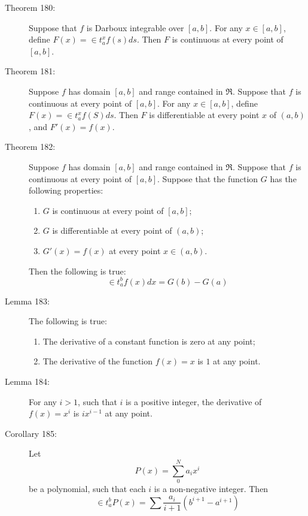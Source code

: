 \documentclass{article}
\begin{document}
\begin{description}
  \item[Theorem 180:] Suppose that $f$ is Darboux integrable over $[a,b]$. For any $x \in [a,b]$, define $F(x) = \in t_{a}^{x} f(s) ds$. Then $F$ is continuous at every point of $[a,b]$. 

  \item[Theorem 181:] Suppose $f$ has domain $[a,b]$ and range contained in $\Re$. Suppose that $f$ is continuous at every point of $[a,b]$. For any $x \in [a,b]$, define $F(x) = \in t_{a}^{x} f(S) ds$. Then $F$ is differentiable at every point $x$ of $(a,b)$, and $F' (x) = f(x)$. 

  \item[Theorem 182:] Suppose $f$ has domain $[a,b]$ and range contained in $\Re$. Suppose that $f$ is continuous at every point of $[a,b]$. Suppose that the function $G$ has the following properties:
    \begin{enumerate}[\hspace{1cm}1.]
      \item $G$ is continuous at every point of $[a,b]$;
      \item $G$ is differentiable at every point of $(a,b)$;
      \item $G' (x) = f(x)$ at every point $x \in (a,b)$.
    \end{enumerate}
    Then the following is true:
    \begin{equation*}
      \in t_{a}^{b} f(x) dx = G(b) -G(a)
    \end{equation*}

  \item[Lemma 183:] The following is true:
    \begin{enumerate}[\hspace{1cm}1.]
      \item The derivative of a constant function is zero at any point;
      \item The derivative of the function $f(x) = x$ is $1$ at any point.
    \end{enumerate}

  \item[Lemma 184:] For any $i > 1$, such that $i$ is a positive integer, the derivative of $f(x) = x^{i}$ is $ix^{i-1}$ at any point.

  \item[Corollary 185:] Let
    \begin{equation*}
      P(x) = \sum_{0}^{N} a_{i}x^{i}
    \end{equation*}
    be a polynomial, such that each $i$ is a non-negative integer. Then
    \begin{equation*}
      \in t_{a}^{b} P(x) = \sum \frac{a_{i}}{i+1} ( b^{i+1} - a^{i+1} )
    \end{equation*}

\end{description}
\end{document}
